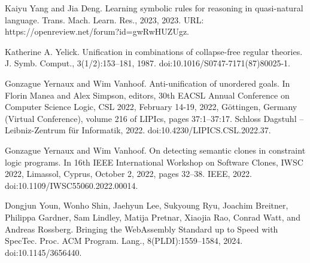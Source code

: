 \par\noindent  [45]  Kaiyu Yang and Jia Deng.  Learning symbolic rules for reasoning in quasi-natural language.  Trans. Mach. Learn. Res., 2023, 2023.  URL: https://openreview.net/forum?id=gwRwHUZUgz.  
 
\par\noindent  [46]  Katherine A. Yelick.  Unification in combinations of collapse-free regular theories.  J. Symb. Comput., 3(1/2):153–181, 1987.  doi:10.1016/S0747-7171(87)80025-1.  
 
\par\noindent  [47]  Gonzague Yernaux and Wim Vanhoof.  Anti-unification of unordered goals.  In Florin Manea and Alex Simpson, editors, 30th EACSL Annual Conference on Computer Science Logic, CSL 2022, February 14-19, 2022, Göttingen, Germany (Virtual Conference), volume 216 of LIPIcs, pages 37:1–37:17. Schloss Dagstuhl – Leibniz-Zentrum für Informatik, 2022.  doi:10.4230/LIPICS.CSL.2022.37.  
 
\par\noindent  [48]  Gonzague Yernaux and Wim Vanhoof.  On detecting semantic clones in constraint logic programs.  In 16th IEEE International Workshop on Software Clones, IWSC 2022, Limassol, Cyprus, October 2, 2022, pages 32–38. IEEE, 2022.  doi:10.1109/IWSC55060.2022.00014.  
 
\par\noindent  [49]  Dongjun Youn, Wonho Shin, Jaehyun Lee, Sukyoung Ryu, Joachim Breitner, Philippa Gardner, Sam Lindley, Matija Pretnar, Xiaojia Rao, Conrad Watt, and Andreas Rossberg.  Bringing the WebAssembly Standard up to Speed with SpecTec.  Proc. ACM Program. Lang., 8(PLDI):1559–1584, 2024.  doi:10.1145/3656440.  
  

